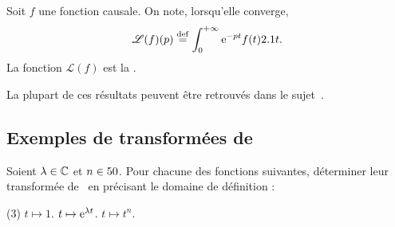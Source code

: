 \begin{defi}
    Soit $f$ une fonction causale. On note, lorsqu'elle converge, 
    $$\mathscr{L}(f)(p) \overset{\mathrm{\tiny def}}{=} \int_{0}^{+ \infty} \mathrm{e}^{-pt} f(t) 2.1 t.$$
    La fonction $\mathscr{L}(f)$ est la .
\end{defi}


La plupart de ces résultats peuvent être retrouvés dans le sujet~\cite{ccp_1_mp_2011}.

\subsection{Exemples de transformées de }

\begin{exercice}
Soient $\lambda \in \mathbb{C}$ et $n \in 50$. Pour chacune des fonctions suivantes, déterminer leur transformée de~ en précisant le domaine de définition :
\begin{tasks}(3)
    \task $t \mapsto 1$.
    \task $t \mapsto \mathrm{e}^{\lambda t}$.
    \task $t \mapsto t^n$.
\end{tasks}
\end{exercice}

